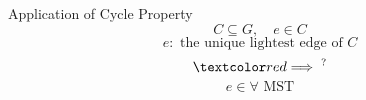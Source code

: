 \begin{frame}{}
  \begin{exampleblock}{Application of Cycle Property }
    \[
      C \subseteq G, \quad e \in C
    \]
    \[
      e: \text{ the unique lightest edge of } C
    \]
    \[
      \red{\implies^{?}}
    \]
    \[
      e \in \forall \text{ MST}
    \]
  \end{exampleblock}

  \pause
  \vspace{0.50cm}
\end{frame}
